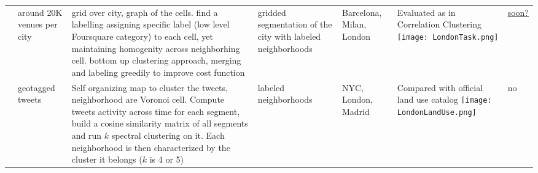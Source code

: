 \begin{table}[htpb]
\begin{tabulary}{1.35\textwidth}{LLLLLLL}
		\autocite{ICWSM1510580} & around 20K venues per city & grid over city, graph of the cells. find a labelling assigning specific label (low level Foursquare category) to each cell, yet maintaining homogenity across neighborhing cell. bottom up clustering approach, merging and labeling greedily to improve cost function & gridded segmentation of the city with labeled neighborhoods & Barcelona, Milan, London & Evaluated as in Correlation Clustering \texttt{[image: LondonTask.png]} & \href{http://researchswinger.org/tbscan/}{soon?} \\
		\autocite{spectralLandUseTwitter14} & geotagged tweets & Self organizing map to cluster the tweets, neighborhood are Voronoi cell. Compute tweets activity across time for each segment, build a cosine similarity matrix of all segments and run $k$ spectral clustering on it. Each neighborhood is then characterized by the cluster it belongs ($k$ is 4 or 5) & labeled neighborhoods & NYC, London, Madrid & Compared with official land use catalog \texttt{[image: LondonLandUse.png]} & no \\
		\bottomrule
	\end{tabulary}
\end{table}

